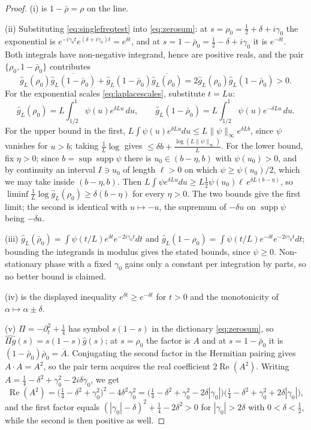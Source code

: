 \documentclass[11pt]{amsart}
\theoremstyle{definition}
\theoremstyle{remark}
\newcommand{\Rel}{\operatorname{Re}}
\newcommand{\supp}{\operatorname{supp}}
\begin{document}
\begin{proof}
(i) is $1-\bar\rho=\rho$ on the line.

(ii) Substituting \eqref{eq:singlefreqtest} into \eqref{eq:zerosum}: at
$s=\rho_0=\tfrac12+\delta+i\gamma_0$ the exponential is
$e^{-i\gamma_0t}e^{(\delta+i\gamma_0)t}=e^{\delta t}$, and at
$s=1-\bar\rho_0=\tfrac12-\delta+i\gamma_0$ it is $e^{-\delta t}$. Both
integrals have non-negative integrand, hence are positive reals, and the pair
$\{\rho_0,1-\bar\rho_0\}$ contributes
\[
  \widehat g_L(\rho_0)\overline{\widehat g_L(1-\bar\rho_0)}
   +\widehat g_L(1-\bar\rho_0)\overline{\widehat g_L(\rho_0)}
   =2\widehat g_L(\rho_0)\widehat g_L(1-\bar\rho_0)>0 .
\]
For the exponential scales \eqref{eq:laplacescales}, substitute $t=Lu$:
\[
  \widehat g_L(\rho_0)=L\int_{1/2}^{1}\psi(u)e^{\delta Lu}\,du,\qquad
  \widehat g_L(1-\bar\rho_0)=L\int_{1/2}^{1}\psi(u)e^{-\delta Lu}\,du .
\]
For the upper bound in the first,
$L\int\psi(u)e^{\delta Lu}du\le L\|\psi\|_\infty e^{\delta Lb}$, since
$\psi$ vanishes for $u>b$; taking $\frac1L\log$ gives
$\le\delta b+\frac{\log(L\|\psi\|_\infty)}L$. For the lower bound, fix
$\eta>0$; since $b=\sup\supp\psi$ there is $u_0\in(b-\eta,b)$ with
$\psi(u_0)>0$, and by continuity an interval $I\ni u_0$ of length $\ell>0$ on
which $\psi\ge\psi(u_0)/2$, which we may take inside $(b-\eta,b)$. Then
$L\int\psi e^{\delta Lu}du\ge L\tfrac12\psi(u_0)\ell\,e^{\delta L(b-\eta)}$,
so $\liminf\frac1L\log\widehat g_L(\rho_0)\ge\delta(b-\eta)$ for every
$\eta>0$. The two bounds give the first limit; the second is identical with
$u\mapsto-u$, the supremum of $-\delta u$ on $\supp\psi$ being $-\delta a$.

(iii) $\widehat g_L(\bar\rho_0)=\int\psi(t/L)e^{\delta t}e^{-2i\gamma_0t}dt$
and $\widehat g_L(1-\rho_0)=\int\psi(t/L)e^{-\delta t}e^{-2i\gamma_0t}dt$;
bounding the integrands in modulus gives the stated bounds, since $\psi\ge0$.
Non-stationary phase with a fixed $\gamma_0$ gains only a constant per
integration by parts, so no better bound is claimed.

(iv) is the displayed inequality $e^{\delta t}\ge e^{-\delta t}$ for $t>0$ and
the monotonicity of $\alpha\mapsto\alpha\pm\delta$.

(v) $\Pi=-\partial_t^2+\tfrac14$ has symbol $s(1-s)$ in the dictionary
\eqref{eq:zerosum}, so $\widehat{\Pi g}(s)=s(1-s)\widehat g(s)$; at $s=\rho_0$
the factor is $A$ and at $s=1-\bar\rho_0$ it is
$(1-\bar\rho_0)\bar\rho_0=\overline A$. Conjugating the second factor in the
Hermitian pairing gives $A\cdot A=A^2$, so the pair term acquires the real
coefficient $2\Rel(A^2)$. Writing
$A=\tfrac14-\delta^2+\gamma_0^2-2i\delta\gamma_0$, we get
\[
  \Rel(A^2)=\bigl(\tfrac14-\delta^2+\gamma_0^2\bigr)^2-4\delta^2\gamma_0^2
   =\bigl(\tfrac14-\delta^2+\gamma_0^2-2\delta|\gamma_0|\bigr)
    \bigl(\tfrac14-\delta^2+\gamma_0^2+2\delta|\gamma_0|\bigr),
\]
and the first factor equals $(|\gamma_0|-\delta)^2+\tfrac14-2\delta^2>0$ for
$|\gamma_0|>2\delta$ with $0<\delta<\tfrac12$, while the second is then
positive as well.
\end{proof}
\end{document}
